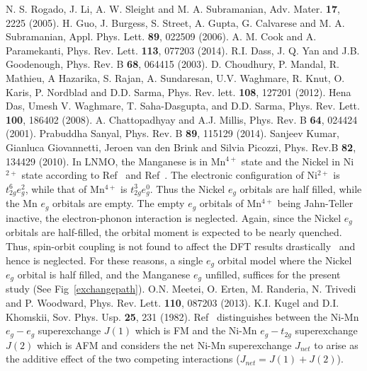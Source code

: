 \documentclass[english,aps,prb,twocolumn,showpacs]{revtex4-1}
\begin{document}
\begin{thebibliography}{99}
 N. S. Rogado, J. Li, A. W. Sleight and M. A. Subramanian, Adv. Mater. {\bf 17}, 2225 (2005). 
 H. Guo, J. Burgess, S. Street, A. Gupta, G. Calvarese and M. A. Subramanian, Appl. Phys. Lett. {\bf 89}, 022509 (2006).
 A. M. Cook and A. Paramekanti, Phys. Rev. Lett. {\bf 113}, 077203 (2014). 
 R.I. Dass, J. Q. Yan and J.B. Goodenough, Phys. Rev. B {\bf 68}, 064415 (2003). 
 D. Choudhury, P. Mandal, R. Mathieu, A Hazarika, S. Rajan, A. Sundaresan, U.V. Waghmare, R. Knut,
                 O. Karis, P. Nordblad and D.D. Sarma, Phys. Rev. lett. {\bf 108}, 127201 (2012).
 Hena Das, Umesh V. Waghmare, T. Saha-Dasgupta, and D.D. Sarma, Phys. Rev. Lett. {\bf 100},
186402 (2008).
 A. Chattopadhyay and A.J. Millis, Phys. Rev. B {\bf 64}, 024424 (2001).
 Prabuddha Sanyal, Phys. Rev. B {\bf 89}, 115129 (2014).
 Sanjeev Kumar, Gianluca Giovannetti, Jeroen van den Brink and Silvia Picozzi, Phys. Rev.B {\bf 82},
 134429 (2010).
  In LNMO, the Manganese is in Mn$^{4+}$ state and the Nickel in Ni$^{2+}$ state 
 according to Ref~\cite{debraj} and Ref~\cite{Tanusri}. The electronic configuration
   of Ni$^{2+}$ is $t_{2g}^{6}e_{g}^{2}$, while that of Mn$^{4+}$ is $t_{2g}^{3}e_{g}^{0}$.
  Thus the Nickel $e_{g}$ orbitals are
 half filled, while the Mn $e_{g}$ orbitals are empty.
 The empty $e_{g}$ orbitals of Mn$^{4+}$ being Jahn-Teller
 inactive, the electron-phonon interaction is neglected.
  Again, since the Nickel $e_{g}$ orbitals are half-filled, the orbital moment is expected to be nearly quenched.
 Thus, spin-orbit coupling is not found to affect the DFT results drastically~\cite{Tanusri} and hence is neglected.
 For these reasons, a single $e_{g}$ orbital model where the Nickel $e_{g}$ orbital
 is half filled, and the Manganese $e_{g}$ unfilled, suffices for the present study (See Fig~\ref{exchangepath}).
 O.N. Meetei, O. Erten, M. Randeria, N. Trivedi and P. Woodward, Phys. Rev. Lett. {\bf 110}, 087203 (2013).
 K.I. Kugel and D.I. Khomskii, Sov. Phys. Usp. {\bf 25}, 231 (1982).
 Ref~\cite{Tanusri} distinguishes between the Ni-Mn $e_{g}-e_{g}$ superexchange $J(1)$
  which is FM and the Ni-Mn $e_{g}-t_{2g}$ superexchange $J(2)$ which is AFM and considers
 the net Ni-Mn superexchange $J_{net}$ 
to arise as the additive effect of the two competing interactions ($J_{net}=J(1)+J(2)$).

\end{thebibliography}
\end{document}
